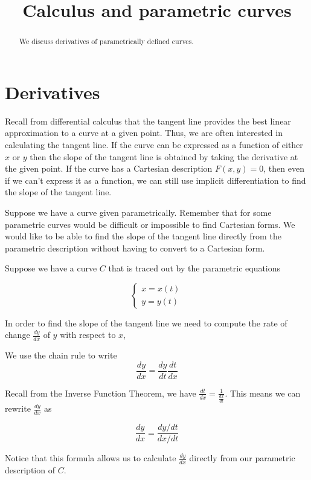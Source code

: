 \documentclass{ximera}
\title[Dig-In:]{Calculus and parametric curves}
\begin{document}
\begin{abstract}
  We discuss derivatives of parametrically defined curves.  
\end{abstract}
\maketitle

\section{Derivatives}

Recall from differential calculus that the tangent line provides the best linear approximation to a curve at a given point. Thus, we are often interested in calculating the tangent line.   If the curve can be expressed as a function of either $x$ or $y$ then the slope of the tangent line is obtained by taking the derivative at the given point. If the curve has a Cartesian description $F(x,y)=0$, then even if we can't express it as a function, we can still use implicit differentiation to find the slope of the tangent line. 

Suppose we have a curve given parametrically. Remember that for some parametric curves would be difficult or impossible to find Cartesian forms. We would like to be able to find the slope of the tangent line directly from the parametric description without having to convert to a Cartesian form.


Suppose we have a curve $C$ that is traced out by the parametric equations

\[ 
\begin{cases}
x=x(t) \\
y=y(t)
\end{cases}
\]

In order to find the slope of the tangent line we need to compute the rate of change  $\frac{dy}{dx}$ of $y$ with respect to $x$,

We use the chain rule to write 
\[
\frac{dy}{dx} = \frac{dy}{dt} \frac{dt}{dx}
\]

Recall from the Inverse Function Theorem, we have $\frac{dt}{dx}=\frac{1}{\frac{dx}{dt}}$. This means we can rewrite $\frac{dy}{dx}$ as 

\[
\frac{dy}{dx} = \frac{dy / dt }{dx/ dt}
\]

Notice that this formula allows us to calculate $\frac{dy}{dx}$ directly from our parametric description of $C$.
\end{document}
